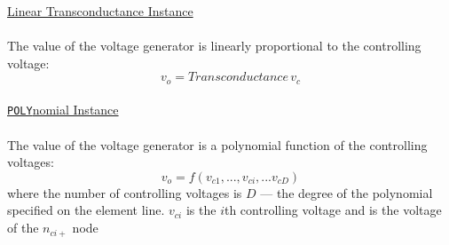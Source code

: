 \noindent\underline{Linear Transconductance Instance}
\\[0.1in]\hspace*{\fill}\\[0.1in]
The value of the voltage generator is linearly proportional to the
controlling voltage:
\begin{equation}
v_o = Transconductance\,v_c
\end{equation}
\\[0.2in]\noindent\underline{{\tt POLY}nomial Instance}
\\[0.1in]\hspace*{\fill}\\[0.1in]
The value of the voltage generator is a polynomial function of the
controlling voltages:
\begin{equation}
v_o = f(v_{c1}, ...,  v_{ci}, ...  v_{cD})
\end{equation}
where the number of controlling voltages is $D$ --- the degree of
the polynomial specified on the element line. $v_{ci}$ is the
$i$th controlling voltage and is the voltage of the $n_{ci+}$ node
